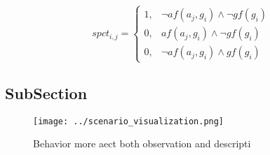 \documentclass[a4paper]{article}
\begin{document}
\begin{equation}
spct_{i,j} =
\begin{cases}
1, & \text{$\neg af(a_j,g_i) \wedge \neg gf(g_i)$}\\
0, & \text{$af(a_j,g_i) \wedge \neg gf(g_i)$}\\
0, & \text{$\neg af(a_j,g_i) \wedge gf(g_i)$}
\end{cases}
\end{equation}

\subsection{SubSection}

\begin{figure}
\centering
\texttt{[image: ../scenario\_visualization.png]}
\caption{Behavior more aect both observation and descripti
}
\end{figure}
 
\end{document}
